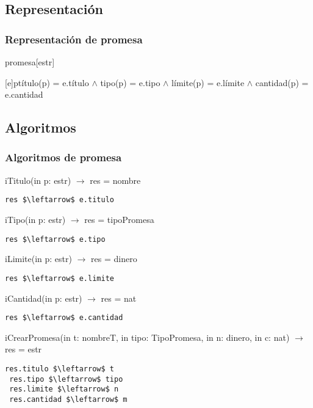 
\subsection{Representaci\'on}
\subsubsection{Representaci\'on de promesa}
\begin{Estructura}{promesa}[estr]
    \begin{Tupla}[estr]
    \end{Tupla}
\end{Estructura}


[e]{p}{t\'itulo(p) = e.t\'itulo $\land$ tipo(p) = e.tipo $\land$ l\'imite(p) = e.l\'imite $\land$ cantidad(p) = e.cantidad}

  \subsection{Algoritmos}
\subsubsection{Algoritmos de promesa}

iTitulo(in p: estr) $\rightarrow$ res = nombre
\begin{lstlisting}[mathescape]
 res $\leftarrow$ e.titulo
\end{lstlisting}

iTipo(in p: estr) $\rightarrow$ res = tipoPromesa
\begin{lstlisting}[mathescape]
 res $\leftarrow$ e.tipo
\end{lstlisting}

iLimite(in p: estr) $\rightarrow$ res = dinero
\begin{lstlisting}[mathescape]
 res $\leftarrow$ e.limite
\end{lstlisting}


iCantidad(in p: estr) $\rightarrow$ res = nat
\begin{lstlisting}[mathescape]
 res $\leftarrow$ e.cantidad
\end{lstlisting}

iCrearPromesa(in t: nombreT, in tipo: TipoPromesa, in n: dinero, in c: nat) $\rightarrow$ res = estr
\begin{lstlisting}[mathescape]
 res.titulo $\leftarrow$ t
 res.tipo $\leftarrow$ tipo
 res.limite $\leftarrow$ n
 res.cantidad $\leftarrow$ m
\end{lstlisting}


